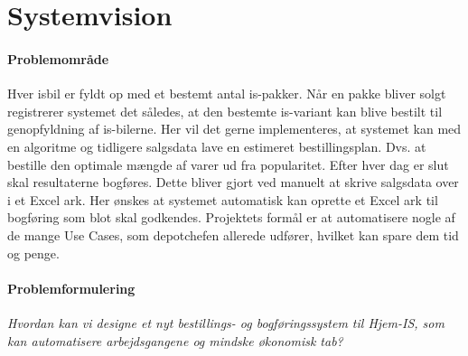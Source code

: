 \chapter{Systemvision}\label{ch:systemvision}

\subsubsection{Problemområde}

Hver isbil er fyldt op med et bestemt antal is-pakker. Når en pakke bliver solgt registrerer systemet det således, at den bestemte is-variant kan blive bestilt til genopfyldning af is-bilerne. Her vil det gerne implementeres, at systemet kan med en algoritme og tidligere salgsdata lave en estimeret bestillingsplan. Dvs. at bestille den optimale mængde af varer ud fra popularitet. 
Efter hver dag er slut skal resultaterne bogføres. Dette bliver gjort ved manuelt at skrive salgsdata over i et Excel ark. Her ønskes at systemet automatisk kan oprette et Excel ark til bogføring som blot skal godkendes.
Projektets formål er at automatisere nogle af de mange Use Cases, som depotchefen allerede udfører, hvilket kan spare dem tid og penge.

\subsubsection{Problemformulering}
\textit{Hvordan kan vi designe et nyt bestillings- og bogføringssystem til Hjem-IS, som kan automatisere arbejdsgangene og mindske økonomisk tab?}